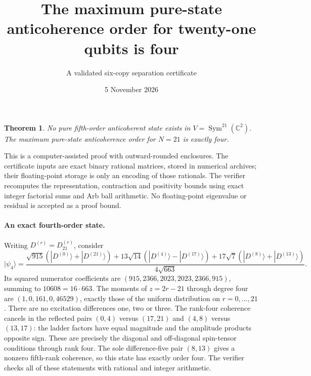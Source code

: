\documentclass[11pt]{article}
\newtheorem{theorem}{Theorem}
\newcommand{\Sym}{\operatorname{Sym}}
\begin{document}
\title{The maximum pure-state anticoherence order for twenty-one qubits is four}
\author{A validated six-copy separation certificate}
\date{5 November 2026}
\maketitle
\begin{theorem}
No pure fifth-order anticoherent state exists in $V=\Sym^{21}(\mathbb C^2)$. The maximum pure-state anticoherence order for $N=21$ is exactly four.
\end{theorem}
This is a computer-assisted proof with outward-rounded enclosures. The certificate inputs are exact binary rational matrices, stored in numerical archives; their floating-point storage is only an encoding of those rationals. The verifier recomputes the representation, contraction and positivity bounds using exact integer factorial sums and Arb ball arithmetic. No floating-point eigenvalue or residual is accepted as a proof bound.

\paragraph{An exact fourth-order state.}
Writing $D^{(r)}=D_{21}^{(r)}$, consider
\[
 |\psi_4\rangle=
 \frac{\sqrt{915}(|D^{(0)}\rangle+|D^{(21)}\rangle)
 +13\sqrt{14}(|D^{(4)}\rangle-|D^{(17)}\rangle)
 +17\sqrt7(|D^{(8)}\rangle+|D^{(13)}\rangle)}{4\sqrt{663}}.
\]
Its squared numerator coefficients are $(915,2366,2023,2023,2366,915)$, summing to $10608=16\cdot663$. The moments of $z=2r-21$ through degree four are $(1,0,161,0,46529)$, exactly those of the uniform distribution on $r=0,\ldots,21$. There are no excitation differences one, two or three. The rank-four coherence cancels in the reflected pairs $(0,4)$ versus $(17,21)$ and $(4,8)$ versus $(13,17)$: the ladder factors have equal magnitude and the amplitude products opposite sign. These are precisely the diagonal and off-diagonal spin-tensor conditions through rank four. The sole difference-five pair $(8,13)$ gives a nonzero fifth-rank coherence, so this state has exactly order four. The verifier checks all of these statements with rational and integer arithmetic.
\end{document}
